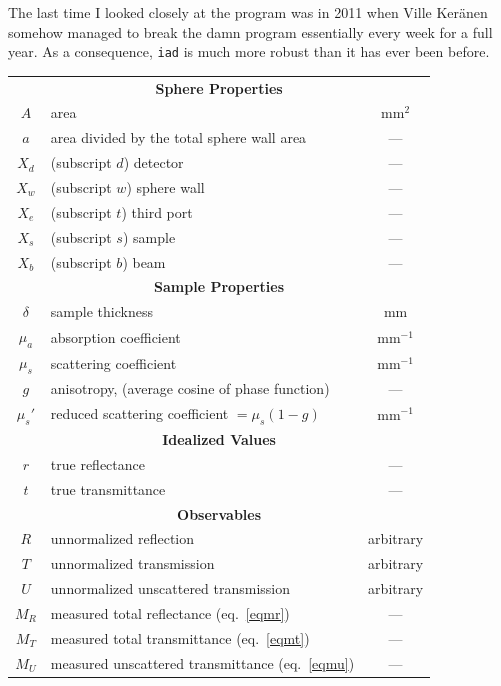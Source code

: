 \documentclass{article}
\newcommand\iadprog{\texttt{iad}}
\begin{document}
The last time I looked closely at the program was in 2011 when Ville
Ker{\"a}nen somehow managed to break the damn program essentially every week for a
full year.  As a consequence, \iadprog{} is much more robust than it has ever been before.

\newpage
\tableofcontents 

\newpage

\begin{table}[b]
\centering
\begin{tabular}{cp{7cm}c}
\multicolumn{3}{c}{\textbf{Sphere Properties}}\\
$A$   & area&	mm$^2$\\
$a$   & area divided by the total sphere wall area& ---\\[2mm]
$X_d$ & (subscript $d$) detector    & ---\\
$X_w$ & (subscript $w$) sphere wall & ---\\
$X_e$ & (subscript $t$) third port  & ---\\
$X_s$ & (subscript $s$) sample      & ---\\
$X_b$ & (subscript $b$) beam        & ---\\[8mm]
%
%
\multicolumn{3}{c}{\textbf{Sample Properties}}\\
$\delta$ & sample thickness & mm\\
$\mu_a$  & absorption coefficient 				&	mm$^{-1}$\\
$\mu_s$  & scattering coefficient 				&	mm$^{-1}$\\
$g$      & anisotropy, (average cosine of phase function) & --- \\
$\mu_s'$ & reduced scattering coefficient $=\mu_s(1-g)$&	mm$^{-1}$\\[8mm]
%
%
\multicolumn{3}{c}{\textbf{Idealized Values}}\\
$r$ & true reflectance & ---\\
$t$ & true transmittance & ---\\[8mm]
%
%
\multicolumn{3}{c}{\textbf{Observables}}\\
$R$ & unnormalized reflection & arbitrary\\
$T$ & unnormalized transmission & arbitrary\\
$U$ & unnormalized unscattered transmission & arbitrary\\[2mm]
$M_R$ & measured total reflectance (eq.~\ref{eqmr})&	---\\
$M_T$ & measured total transmittance (eq.~\ref{eqmt})&	---\\
$M_U$ & measured unscattered transmittance (eq.~\ref{eqmu})&	---\\[2mm]

\end{tabular}
\end{table}
\end{document}
